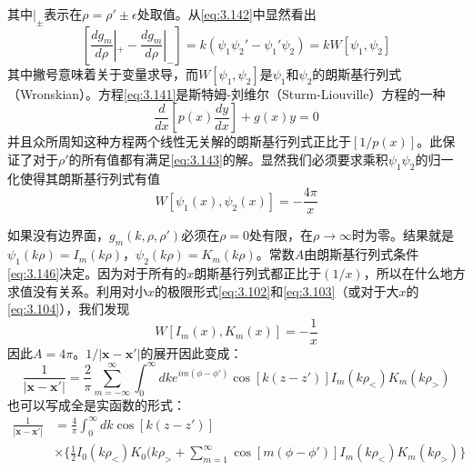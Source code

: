 \documentclass[12pt]{book}
\numberwithin{equation}{chapter}
\numberwithin{figure}{chapter}
\numberwithin{footnote}{page}
\begin{document}
其中$|_{\pm}$表示在$\rho=\rho'\pm\epsilon$处取值。从\autoref{eq:3.142}中显然看出
\begin{equation}\label{eq:3.144}
    [\frac{dg_m}{d\rho}|_+-\frac{dg_m}{d\rho}|_-]=k(\psi_1\psi_2'-\psi_1'\psi_2)=kW[\psi_1,\psi_2]
\end{equation}
其中撇号意味着关于变量求导，而$W[\psi_1,\psi_2]$是$\psi_1$和$\psi_2$的朗斯基行列式（Wronskian）。方程\autoref{eq:3.141}是斯特姆-刘维尔（Sturm-Liouville）方程的一种
\begin{equation}\label{eq:3.145}
    \frac{d}{dx}[p(x)\frac{dy}{dx}]+g(x)y=0
\end{equation}
并且众所周知这种方程两个线性无关解的朗斯基行列式正比于$[1/p(x)]$。此保证了对于$\rho'$的所有值都有满足\autoref{eq:3.143}的解。显然我们必须要求乘积$\psi_1\psi_2$的归一化使得其朗斯基行列式有值
\begin{equation}\label{eq:3.146}
    W[\psi_1(x),\psi_2(x)]=-\frac{4\pi}{x}
\end{equation}

如果没有边界面，$g_m(k,\rho,\rho')$必须在$\rho=0$处有限，在$\rho\to\infty$时为零。结果就是$\psi_1(k\rho)=I_m(k\rho)$，$\psi_2(k\rho)=K_m(k\rho)$。常数$A$由朗斯基行列式条件\autoref{eq:3.146}决定。因为对于所有的$x$朗斯基行列式都正比于$(1/x)$，所以在什么地方求值没有关系。利用对小$x$的极限形式\autoref{eq:3.102}和\autoref{eq:3.103}（或对于大$x$的\autoref{eq:3.104}），我们发现
\begin{equation}\label{eq:3.147}
    W[I_m(x),K_m(x)]=-\frac{1}{x}
\end{equation}
因此$A=4\pi$。$1/|\mathbf{x}-\mathbf{x'}|$的展开因此变成：
\begin{equation}\label{eq:3.148}
    \frac{1}{|\mathbf{x}-\mathbf{x'}|}=\frac{2}{\pi}\sum_{m=-\infty}^\infty \int_0^\infty dk e^{im(\phi-\phi')}\cos[k(z-z')]I_m(k\rho_<)K_m(k\rho_>)
\end{equation}
也可以写成全是实函数的形式：
\begin{equation}\label{eq:3.149}
    \begin{aligned}
        \frac{1}{|\mathbf{x}-\mathbf{x'}|}&=\frac{4}{\pi}\int_0^\infty dk\cos[k(z-z')]\\
        &\times \{\frac{1}{2}I_0(k\rho_<)K_0(k\rho_>+\sum_{m=1}^\infty \cos[m(\phi-\phi')]I_m(k\rho_<)K_m(k\rho_>)\}\\
    \end{aligned}
\end{equation}
\end{document}
